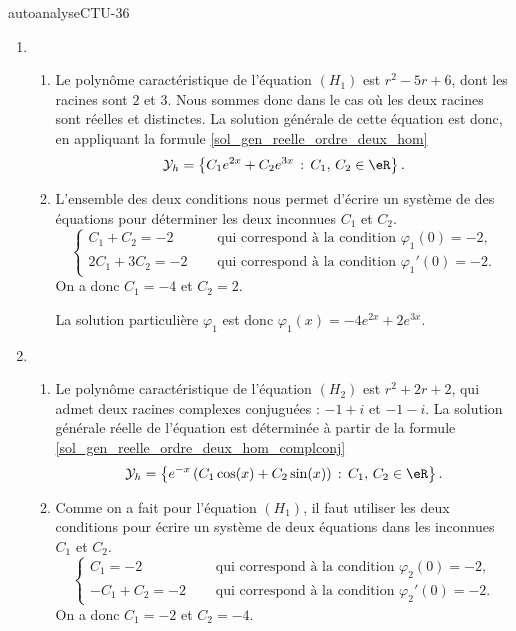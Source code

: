 
\begin{corrige}{autoanalyseCTU-36}

\begin{enumerate}
\item \begin{enumerate}
\item  Le polyn\^ome caractéristique de l'équation $(H_{1})$ est  $r^2-5r+6$, dont les racines sont $2$ et $3$. Nous sommes donc dans le cas où les deux racines sont réelles et distinctes. La solution générale de cette équation est donc, en appliquant la formule \eqref{sol_gen_reelle_ordre_deux_hom}
  \begin{equation*}
  \mathcal{Y}_h  = \left\{C_1 e^{2x} +C_2 e^{3x} \,:\, C_1,\, C_2 \in \eR\right\}.
  \end{equation*}
\item L'ensemble des deux conditions nous permet d'écrire un système de des équations pour déterminer les deux inconnues $C_1$ et $C_2$. 
  \begin{equation*}
    \begin{cases}
      C_1+ C_2 =-2 & \quad\text{ qui correspond à la condition }\varphi_{1}(0)=-2,\\
      2C_1 + 3C_2 = -2 & \quad\text{ qui correspond à la condition }\varphi_{1}'(0)=-2.
    \end{cases}
  \end{equation*}
  On a donc $C_1 = -4$ et $C_2= 2$.

 La solution particulière $\varphi_{1}$ est donc $\varphi_{1}(x)= -4e^{2x} +2 e^{3x}$.
\end{enumerate}
\item \begin{enumerate}
\item   Le polyn\^ome caractéristique de l'équation $(H_{2})$ est  $r^2+2r+2$, qui admet deux racines complexes conjuguées : $-1 +i $ et $-1 -i $. La solution générale réelle de l'équation est déterminée à partir de la formule \eqref{sol_gen_reelle_ordre_deux_hom_complconj}
  \begin{equation}\label{exoautoanal36part2}
    \mathcal{Y}_h  = \left\{ e^{-x}\left(C_1\cos(x) +C_2\sin(x)\right)  \,:\, C_1,\, C_2 \in \eR \right\}.
  \end{equation} 
\item Comme on a fait pour l'équation $(H_{1})$, il faut utiliser les deux conditions pour écrire un système de deux équations dans les inconnues $C_1$ et $C_2$.
  \begin{equation*}
    \begin{cases}
      C_1=-2 & \quad\text{ qui correspond à la condition }\varphi_{2}(0)=-2,\\
      -C_1 + C_2 = -2 & \quad\text{ qui correspond à la condition }\varphi_{2}'(0)=-2.
    \end{cases}
  \end{equation*}
  On a donc $C_1 = -2$ et $C_2= -4$.  


\end{enumerate}
\end{enumerate}
\end{corrige}
